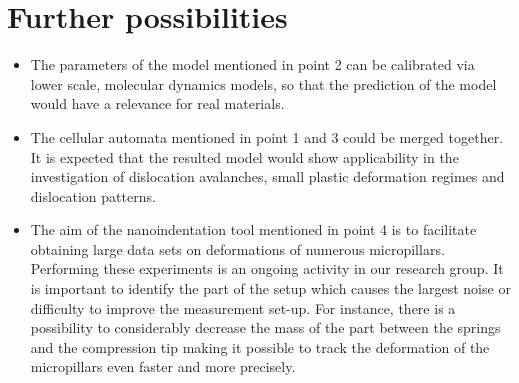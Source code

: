 \documentclass[a5paper,twoside,10pt]{article}
\begin{document}
\section*{Further possibilities}
\begin{itemize}
\item The parameters of the model mentioned in point 2 can be calibrated via lower scale, molecular dynamics models, so that the prediction of the model would have a relevance for real materials.

\item The cellular automata mentioned in point 1 and 3 could be merged together. It is expected that the resulted model would show applicability in the investigation of dislocation avalanches, small plastic deformation regimes and dislocation patterns.

\item The aim of the nanoindentation tool mentioned in point 4 is to facilitate obtaining large data sets on deformations of numerous micropillars. Performing these experiments is an ongoing activity in our research group. It is important to identify the part of the setup which causes the largest noise or difficulty to improve the measurement set-up. For instance, there is a possibility to considerably decrease the mass of the part between the springs and the compression tip making it possible to track the deformation of the micropillars even faster and more precisely.
\end{itemize}


\begin{spacing}{0.9}
\begin{refcontext}[labelprefix=S]
\printbibliography[keyword={own_publication}, title={Own publications related to the thesis}, resetnumbers]
\end{refcontext}
\printbibliography[notkeyword={own_publication}, title={References},resetnumbers]
\end{spacing}
\end{document}

